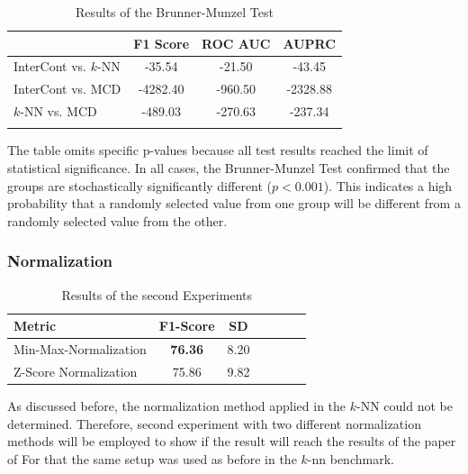 \begin{table}[ht]
\centering
\caption{Results of the Brunner-Munzel Test}
\label{tab:brunnermunzel}
\small 
\begin{tabular}{l S[table-format=2.2] S[table-format=2.2] S[table-format=2.2]} 
\toprule
& {F1 Score} & {ROC AUC} & {AUPRC} \\ %
\midrule
InterCont vs. $k$-NN & -35.54  & -21.50  & -43.45     \\
InterCont vs. MCD    & -4282.40 & -960.50  & -2328.88   \\
$k$-NN vs. MCD       & -489.03 & -270.63 & -237.34    \\

\bottomrule
\addlinespace
{}
\end{tabular}
\end{table}

The table omits specific p-values because all test results reached the limit of statistical significance. 
In all cases, the Brunner-Munzel Test confirmed that the groups are stochastically significantly different ($p<0.001$). 
This indicates a high probability that a randomly selected value from one group will be different from a randomly selected value from the other.


\subsubsection*{Normalization}

\begin{table}[h]
\centering
\caption{Results of the second Experiments}
\label{tab:normalizations}
\begin{tabular}{lcccccc} 
\toprule
\textbf{Metric}         & \textbf{F1-Score}  & \textbf{SD}      &       \\
\midrule
Min-Max-Normalization   & \textbf{76.36}     & 8.20             &       \\
Z-Score Normalization   & 75.86              & 9.82             &       \\
\bottomrule
\end{tabular}
\end{table}


As discussed before, the normalization method applied in the $k$-NN could not be determined. 
Therefore, second experiment with two different normalization methods will be employed to show if the result will reach the results of the paper of \citet{shenkar2022anomaly}
For that the same setup was used as before in the $k$-nn benchmark. 


